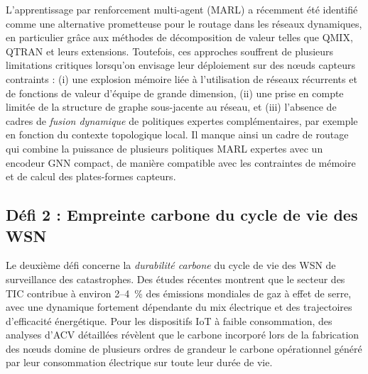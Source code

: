 L'apprentissage par renforcement multi-agent (MARL) a récemment été identifié comme une alternative prometteuse pour le routage dans les réseaux dynamiques, en particulier grâce aux méthodes de décomposition de valeur telles que QMIX, QTRAN et leurs extensions\cite{rashid2018qmix,son2019qtran,liu2024gnncomm,ding_packet_2022}. Toutefois, ces approches souffrent de plusieurs limitations critiques lorsqu'on envisage leur déploiement sur des nœuds capteurs contraints : (i) une explosion mémoire liée à l'utilisation de réseaux récurrents et de fonctions de valeur d'équipe de grande dimension, (ii) une prise en compte limitée de la structure de graphe sous-jacente au réseau, et (iii) l'absence de cadres de \emph{fusion dynamique} de politiques expertes complémentaires, par exemple en fonction du contexte topologique local\cite{liu2024gnncomm,guo2024rldas,Hayes2022MOMARL}. Il manque ainsi un cadre de routage qui combine la puissance de plusieurs politiques MARL expertes avec un encodeur GNN compact, de manière compatible avec les contraintes de mémoire et de calcul des plates-formes capteurs\cite{Nguyen2025GNNIoT,tinyml_review_acm2024}.

\subsection{Défi 2 : Empreinte carbone du cycle de vie des WSN}

Le deuxième défi concerne la \emph{durabilité carbone} du cycle de vie des WSN de surveillance des catastrophes. Des études récentes montrent que le secteur des TIC contribue à environ 2--4~\% des émissions mondiales de gaz à effet de serre, avec une dynamique fortement dépendante du mix électrique et des trajectoires d'efficacité énergétique\cite{freitag2021ict,andrae2021real_climate,itu_ict2025}. Pour les dispositifs IoT à faible consommation, des analyses d'ACV détaillées révèlent que le carbone incorporé lors de la fabrication des nœuds domine de plusieurs ordres de grandeur le carbone opérationnel généré par leur consommation électrique sur toute leur durée de vie\cite{pirson2021embodied,bashir2024sunk,aioti2024carbon}. 

